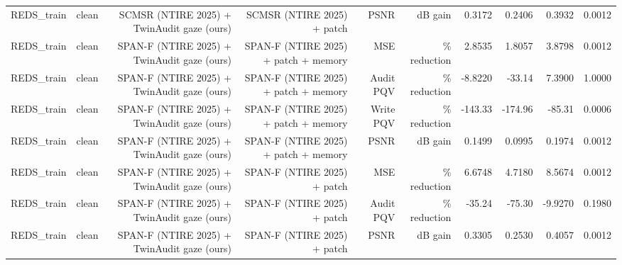 \begin{table}[t]
\begin{tabular}{llrrrrrrrr}
REDS\_train & clean & SCMSR (NTIRE 2025) + TwinAudit gaze (ours) & SCMSR (NTIRE 2025) + patch & PSNR & dB gain & 0.3172 & 0.2406 & 0.3932 & 0.0012 \\
REDS\_train & clean & SPAN-F (NTIRE 2025) + TwinAudit gaze (ours) & SPAN-F (NTIRE 2025) + patch + memory & MSE & \% reduction & 2.8535 & 1.8057 & 3.8798 & 0.0012 \\
REDS\_train & clean & SPAN-F (NTIRE 2025) + TwinAudit gaze (ours) & SPAN-F (NTIRE 2025) + patch + memory & Audit PQV & \% reduction & -8.8220 & -33.14 & 7.3900 & 1.0000 \\
REDS\_train & clean & SPAN-F (NTIRE 2025) + TwinAudit gaze (ours) & SPAN-F (NTIRE 2025) + patch + memory & Write PQV & \% reduction & -143.33 & -174.96 & -85.31 & 0.0006 \\
REDS\_train & clean & SPAN-F (NTIRE 2025) + TwinAudit gaze (ours) & SPAN-F (NTIRE 2025) + patch + memory & PSNR & dB gain & 0.1499 & 0.0995 & 0.1974 & 0.0012 \\
REDS\_train & clean & SPAN-F (NTIRE 2025) + TwinAudit gaze (ours) & SPAN-F (NTIRE 2025) + patch & MSE & \% reduction & 6.6748 & 4.7180 & 8.5674 & 0.0012 \\
REDS\_train & clean & SPAN-F (NTIRE 2025) + TwinAudit gaze (ours) & SPAN-F (NTIRE 2025) + patch & Audit PQV & \% reduction & -35.24 & -75.30 & -9.9270 & 0.1980 \\
REDS\_train & clean & SPAN-F (NTIRE 2025) + TwinAudit gaze (ours) & SPAN-F (NTIRE 2025) + patch & PSNR & dB gain & 0.3305 & 0.2530 & 0.4057 & 0.0012 \\
\bottomrule
\end{tabular}
\end{table}
